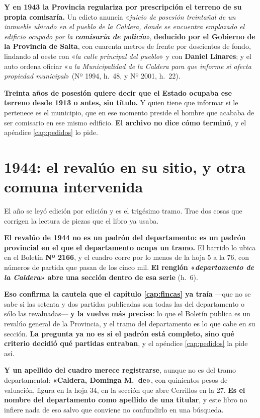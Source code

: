 \begin{cautela}
\textbf{Y en 1943 la Provincia regulariza por prescripción el terreno de su
propia comisaría.} Un edicto anuncia «\textit{juicio de posesión treintañal de un
inmueble ubicado en el pueblo de la Caldera, donde se encuentra emplazado el
edificio ocupado por la \textbf{comisaría de policía}}», \textbf{deducido por el
Gobierno de la Provincia de Salta}, con cuarenta metros de frente por doscientos
de fondo, lindando al oeste con «\textit{la calle principal del pueblo}» y con
\textbf{Daniel Linares}; y el auto ordena oficiar
«\textit{a la Municipalidad de la Caldera para que informe si afecta propiedad
municipal}» (Nº 1994, h.\ 48, y Nº 2001, h.\ 22).

\textbf{Treinta años de posesión quiere decir que el Estado ocupaba ese terreno
desde 1913 o antes, sin título.} Y quien tiene que informar si le pertenece es
el municipio, que en ese momento preside el hombre que acababa de ser comisario
en ese mismo edificio. \textbf{El archivo no dice cómo terminó}, y el apéndice
\ref{cap:pedidos} lo pide.
\end{cautela}

\section{1944: el revalúo en su sitio, y otra comuna intervenida}

El año se leyó edición por edición y es el trigésimo tramo. Trae dos cosas que
corrigen la lectura de piezas que el libro ya usaba.

\begin{cautela}
\textbf{El revalúo de 1944 no es un padrón del departamento: es un padrón
provincial en el que el departamento ocupa un tramo.} El barrido lo ubica en el
Boletín \textbf{Nº 2166}, y el cuadro corre por lo menos de la hoja 5 a la 76,
con números de partida que pasan de los cinco mil. \textbf{El renglón
«\textit{departamento de la Caldera}» abre una sección dentro de esa serie}
(h.\ 6).

\textbf{Eso confirma la cautela que el capítulo \ref{cap:fincas} ya traía} ---que
no se sabe si las setenta y dos partidas publicadas son todas las del
departamento o sólo las revaluadas--- \textbf{y la vuelve más precisa}: lo que
el Boletín publica es un revalúo general de la Provincia, y el tramo del
departamento es lo que cabe en su sección. \textbf{La pregunta ya no es si el
padrón está completo, sino qué criterio decidió qué partidas entraban}, y el
apéndice \ref{cap:pedidos} la pide así.

\textbf{Y un apellido del cuadro merece registrarse}, aunque no es del
tramo departamental: \textbf{«Caldera, Dominga M.\ de»}, con quinientos
pesos de valuación, figura en la hoja 34, en la sección que abre Cerrillos en la 27. \textbf{Es el nombre del departamento como apellido de una
titular}, y este libro no infiere nada de eso salvo que conviene no confundirlo
en una búsqueda.
\end{cautela}

